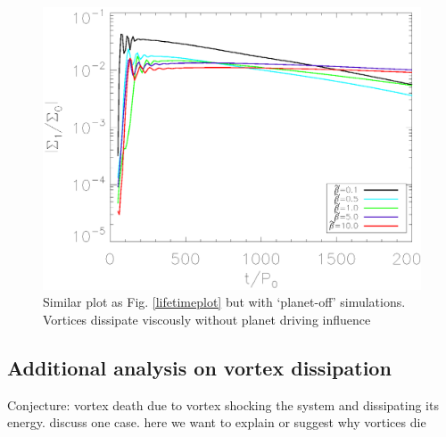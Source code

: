 \begin{figure}
  \includegraphics[width=\linewidth,clip=true,trim=0.5cm
    0cm 0cm 1.1cm]{figures/longterm_planetoff}
  \caption{Similar plot as Fig. \ref{lifetimeplot} but with `planet-off' 
simulations. Vortices dissipate viscously without planet driving influence} \label{planetofflifetimeplot}
\end{figure}

{\bf
\subsection{Additional analysis on vortex dissipation}
Conjecture: vortex death due to vortex shocking the system and
dissipating its energy. discuss one case. here we want to explain or
suggest why vortices die} 

